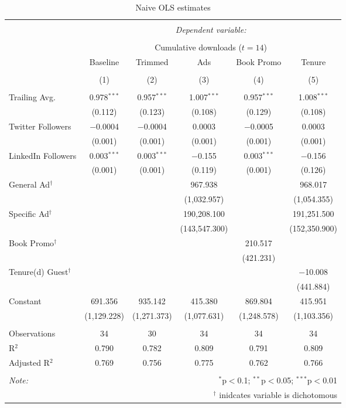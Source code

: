
\begin{table}[h] \centering 
  \caption{Naive OLS estimates} 
  \label{} 
\small 
\begin{tabular}{@{\extracolsep{5pt}}lccccc} 
\\[-1.8ex]\hline 
\hline \\[-1.8ex] 
 & \multicolumn{5}{c}{\textit{Dependent variable:}} \\ 
\cline{2-6} 
\\[-1.8ex] & \multicolumn{5}{c}{Cumulative downloads ($t=14$)} \\ 
 & Baseline & Trimmed & Ads & Book Promo & Tenure \\ 
\\[-1.8ex] & (1) & (2) & (3) & (4) & (5)\\ 
\hline \\[-1.8ex] 
 Trailing Avg. & 0.978$^{***}$ & 0.957$^{***}$ & 1.007$^{***}$ & 0.957$^{***}$ & 1.008$^{***}$ \\ 
  & (0.112) & (0.123) & (0.108) & (0.129) & (0.108) \\ 
  Twitter Followers & $-$0.0004 & $-$0.0004 & 0.0003 & $-$0.0005 & 0.0003 \\ 
  & (0.001) & (0.001) & (0.001) & (0.001) & (0.001) \\ 
  LinkedIn Followers & 0.003$^{***}$ & 0.003$^{***}$ & $-$0.155 & 0.003$^{***}$ & $-$0.156 \\ 
  & (0.001) & (0.001) & (0.119) & (0.001) & (0.126) \\ 
  General Ad$^{\dag}$  &  &  & 967.938 &  & 968.017 \\ 
  &  &  & (1,032.957) &  & (1,054.355) \\ 
  Specific Ad$^{\dag}$ &  &  & 190,208.100 &  & 191,251.500 \\ 
  &  &  & (143,547.300) &  & (152,350.900) \\ 
  Book Promo$^{\dag}$ &  &  &  & 210.517 &  \\ 
  &  &  &  & (421.231) &  \\ 
  Tenure(d) Guest$^{\dag}$ &  &  &  &  & $-$10.008 \\ 
  &  &  &  &  & (441.884) \\ 
  Constant & 691.356 & 935.142 & 415.380 & 869.804 & 415.951 \\ 
  & (1,129.228) & (1,271.373) & (1,077.631) & (1,248.578) & (1,103.356) \\ 
 \hline \\[-1.8ex] 
Observations & 34 & 30 & 34 & 34 & 34 \\ 
R$^{2}$ & 0.790 & 0.782 & 0.809 & 0.791 & 0.809 \\ 
Adjusted R$^{2}$ & 0.769 & 0.756 & 0.775 & 0.762 & 0.766 \\ 
\hline 
\hline \\[-1.8ex] 
\textit{Note:}  & \multicolumn{5}{r}{$^{*}$p$<$0.1; $^{**}$p$<$0.05; $^{***}$p$<$0.01} \\ 
 & \multicolumn{5}{r}{$^{\dag}$ inidcates variable is dichotomous} \\ 
\end{tabular} 
\end{table} 
